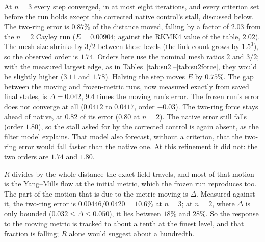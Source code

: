 \documentclass[11pt]{article}
\theoremstyle{definition}
\theoremstyle{remark}
\begin{document}
At $n=3$ every step converged, in at most eight iterations, and every criterion set before the run
holds except the corrected native control's stall, discussed below. The two-ring error is
$0.87\%$ of the distance moved, falling by a factor of $2.03$ from the $n=2$ Cayley run
($E=0.00904$; against the RKMK4 value of the table, $2.02$). The mesh size shrinks by $3/2$
between these levels (the link count grows by $1.5^3$), so the observed order is $1.74$.
Orders here use the nominal mesh ratios $2$ and $3/2$; with the measured largest edge, as in
Tables~\ref{tab:su2}--\ref{tab:su2force}, they would be slightly higher ($3.11$ and $1.78$).
Halving the step moves $E$ by $0.75\%$. The gap between the moving and frozen-metric runs, now
measured exactly from saved final states, is $\Delta=0.042$, $9.4$ times the moving run's
error. The frozen run's error does not converge at all ($0.0412$ to $0.0417$, order $-0.03$).
The two-ring force stays ahead of native, at $0.82$ of its error ($0.80$ at $n=2$). The native
error still falls (order $1.80$), so the stall asked for by the corrected control is again
absent, as the filter model explains. That model also forecast, without a criterion, that the
two-ring error would fall faster than the native one. At this refinement it did not: the two
orders are $1.74$ and $1.80$.

$R$ divides by the whole distance the exact field travels, and most of that motion is the
Yang--Mills flow at the initial metric, which the frozen run reproduces too. The part of the
motion that is due to the metric moving is $\Delta$. Measured against it, the two-ring error
is $0.00446/0.0420=10.6\%$ at $n=3$; at $n=2$, where $\Delta$ is only bounded
($0.032\le\Delta\le0.050$), it lies between $18\%$ and $28\%$. So the response to the moving
metric is tracked to about a tenth at the finest level, and that fraction is falling; $R$ alone
would suggest about a hundredth.
\end{document}
